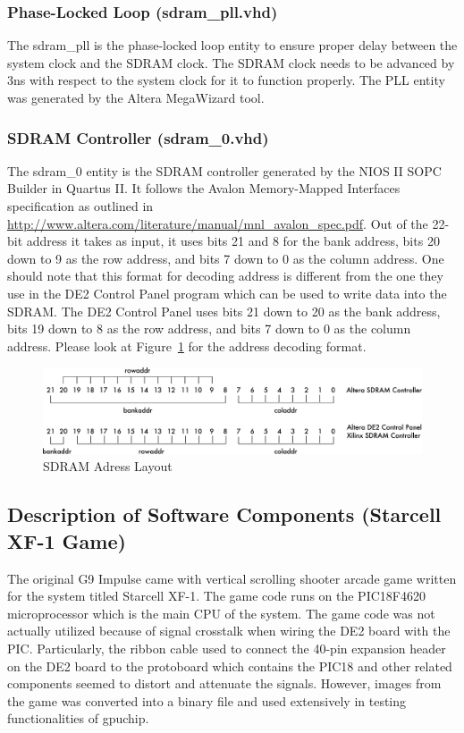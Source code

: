 \documentclass{report}
\begin{document}
\subsubsection{Phase-Locked Loop (sdram\_pll.vhd)}
The sdram\_pll is the phase-locked loop entity to ensure proper delay 
between the system clock and the SDRAM clock. The SDRAM clock needs to 
be advanced by 3ns with respect to the system clock for it to function 
properly. The PLL entity was generated by the Altera MegaWizard tool.

\subsubsection{SDRAM Controller (sdram\_0.vhd)}
The sdram\_0 entity is the SDRAM controller generated by the NIOS II 
SOPC Builder in Quartus II. It follows the Avalon Memory-Mapped 
Interfaces specification as outlined in 
\url{http://www.altera.com/literature/manual/mnl\_avalon\_spec.pdf}. Out 
of the 22-bit address it takes as input, it uses bits 21 and 8 for the 
bank address, bits 20 down to 9 as the row address, and bits 7 down to 0 
as the column address. One should note that this format for decoding 
address is different from the one they use in the DE2 Control Panel 
program which can be used to write data into the SDRAM. The DE2 Control 
Panel uses bits 21 down to 20 as the bank address, bits 19 down to 8 as 
the row address, and bits 7 down to 0 as the column address. Please look
at Figure~\ref{fig:sdram_address} for the address decoding format.

\begin{figure}[htb!]
    \begin{center}
        \includegraphics[width=4.5in]{sdram_addresses}
    \end{center}
    \caption{SDRAM Adress Layout}
    \label{fig:sdram_address}
\end{figure}

\subsection{Description of Software Components (Starcell XF-1 Game)}
The original G9 Impulse came with vertical scrolling shooter arcade game 
written for the system titled Starcell XF-1. The game code runs on the 
PIC18F4620 microprocessor which is the main CPU of the system. The game 
code was not actually utilized because of signal crosstalk when wiring 
the DE2 board with the PIC. Particularly, the ribbon cable used to 
connect the 40-pin expansion header on the DE2 board to the protoboard 
which contains the PIC18 and other related components seemed to distort 
and attenuate the signals. However, images from the game was converted 
into a binary file and used extensively in testing functionalities of 
gpuchip.
\end{document}
